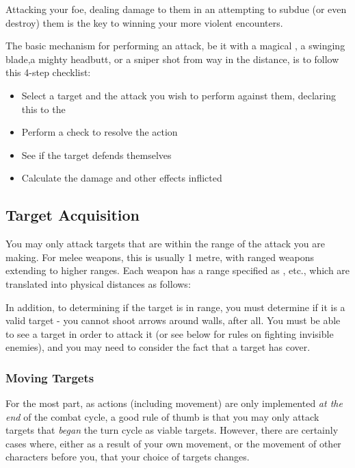 
\label{S:Attacks} 

Attacking your foe, dealing damage to them in an attempting to subdue (or even destroy) them is the key to winning your more violent encounters. 

The basic mechanism for performing an attack, be it with a magical , a swinging blade,a mighty headbutt, or a sniper shot from way in the distance, is to follow this 4-step checklist:

\begin{itemize}
	\item Select a target and the attack you wish to perform against them, declaring this to the 
	\item Perform a check to resolve the action 
	\item See if the target defends themselves
	\item Calculate the damage and other effects inflicted
\end{itemize}

\subsection{Target Acquisition}

You may only attack targets that are within the range of the attack you are making. For melee weapons, this is usually 1 metre, with ranged weapons extending to higher ranges. Each weapon has a range specified as ,  etc., which are translated into physical distances as follows:

\rangetable{}

In addition, to determining if the target is in range, you must determine if it is a valid target - you cannot shoot arrows around walls, after all. You must be able to see a target in order to attack it (or see below for rules on fighting invisible enemies), and you may need to consider the fact that a target has cover. 

\subsubsection{Moving Targets}

For the most part, as actions (including movement) are only implemented {\it at the end} of the combat cycle, a good rule of thumb is that you may only attack targets that {\it began} the turn cycle as viable targets. However, there are certainly cases where, either as a result of your own movement, or the movement of other characters before you, that your choice of targets changes. 

